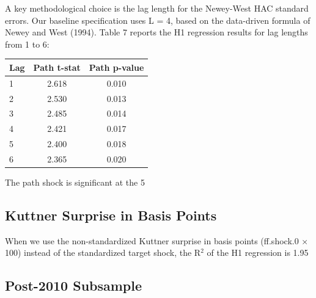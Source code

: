 \documentclass[12pt]{article}
\begin{document}
A key methodological choice is the lag length for the Newey-West HAC standard errors. Our baseline specification uses L = 4, based on the data-driven formula of Newey and West (1994). Table 7 reports the H1 regression results for lag lengths from 1 to 6:

\begin{table}[htbp]
\centering
\begin{tabular}{lcc}
\toprule
Lag & Path t-stat & Path p-value \\
\midrule
1 & 2.618 & 0.010 \\
2 & 2.530 & 0.013 \\
3 & 2.485 & 0.014 \\
4 & 2.421 & 0.017 \\
5 & 2.400 & 0.018 \\
6 & 2.365 & 0.020 \\
\bottomrule
\end{tabular}
\end{table}

The path shock is significant at the 5%

\subsection{Kuttner Surprise in Basis Points}

When we use the non-standardized Kuttner surprise in basis points (ff.shock.0 × 100) instead of the standardized target shock, the R$^2$ of the H1 regression is 1.95%

\subsection{Post-2010 Subsample}
\end{document}
